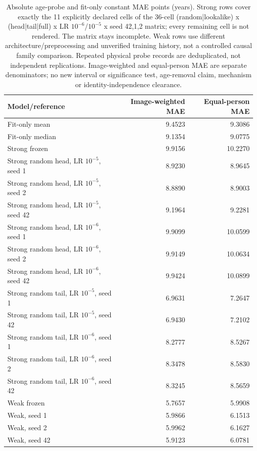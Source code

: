 \begin{table}[!t]
\caption{Absolute age-probe and fit-only constant MAE points (years). Strong rows cover exactly the 11 explicitly declared cells of the 36-cell (random|lookalike) x (head|tail|full) x LR $10^{-6}$/$10^{-5}$ x seed {42,1,2} matrix; every remaining cell is not rendered. The matrix stays incomplete. Weak rows use different architecture/preprocessing and unverified training history, not a controlled causal family comparison. Repeated physical probe records are deduplicated, not independent replications. Image-weighted and equal-person MAE are separate denominators; no new interval or significance test, age-removal claim, mechanism or identity-independence clearance.}
\label{tab:age-probe-absolute-points}
\centering\scriptsize
\begin{tabular}{@{}lrr@{}}
\toprule
Model/reference & Image-weighted MAE & Equal-person MAE \\
\midrule
Fit-only mean & 9.4523 & 9.3086 \\
Fit-only median & 9.1354 & 9.0775 \\
Strong frozen & 9.9156 & 10.2270 \\
Strong random head, LR $10^{-5}$, seed 1 & 8.9230 & 8.9645 \\
Strong random head, LR $10^{-5}$, seed 2 & 8.8890 & 8.9003 \\
Strong random head, LR $10^{-5}$, seed 42 & 9.1964 & 9.2281 \\
Strong random head, LR $10^{-6}$, seed 1 & 9.9099 & 10.0599 \\
Strong random head, LR $10^{-6}$, seed 2 & 9.9149 & 10.0634 \\
Strong random head, LR $10^{-6}$, seed 42 & 9.9424 & 10.0899 \\
Strong random tail, LR $10^{-5}$, seed 1 & 6.9631 & 7.2647 \\
Strong random tail, LR $10^{-5}$, seed 42 & 6.9430 & 7.2102 \\
Strong random tail, LR $10^{-6}$, seed 1 & 8.2777 & 8.5267 \\
Strong random tail, LR $10^{-6}$, seed 2 & 8.3478 & 8.5830 \\
Strong random tail, LR $10^{-6}$, seed 42 & 8.3245 & 8.5659 \\
Weak frozen & 5.7657 & 5.9908 \\
Weak, seed 1 & 5.9866 & 6.1513 \\
Weak, seed 2 & 5.9962 & 6.1627 \\
Weak, seed 42 & 5.9123 & 6.0781 \\
\bottomrule
\end{tabular}
\end{table}
